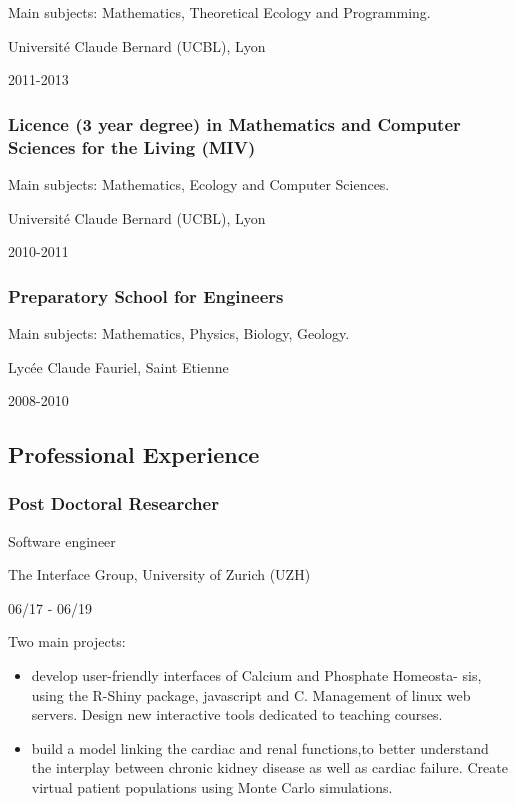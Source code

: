 \documentclass[
]{article}
\providecommand{\tightlist}{%
  \setlength{\itemsep}{0pt}\setlength{\parskip}{0pt}}
\begin{document}
Main subjects: Mathematics, Theoretical Ecology and Programming.

Université Claude Bernard (UCBL), Lyon

2011-2013

\hypertarget{licence-3-year-degree-in-mathematics-and-computer-sciences-for-the-living-miv}{%
\subsubsection{Licence (3 year degree) in Mathematics and Computer
Sciences for the Living
(MIV)}\label{licence-3-year-degree-in-mathematics-and-computer-sciences-for-the-living-miv}}

Main subjects: Mathematics, Ecology and Computer Sciences.

Université Claude Bernard (UCBL), Lyon

2010-2011

\hypertarget{preparatory-school-for-engineers}{%
\subsubsection{Preparatory School for
Engineers}\label{preparatory-school-for-engineers}}

Main subjects: Mathematics, Physics, Biology, Geology.

Lycée Claude Fauriel, Saint Etienne

2008-2010

\hypertarget{professional-experience}{%
\subsection{Professional Experience}\label{professional-experience}}

\hypertarget{post-doctoral-researcher}{%
\subsubsection{Post Doctoral
Researcher}\label{post-doctoral-researcher}}

Software engineer

The Interface Group, University of Zurich (UZH)

06/17 - 06/19

Two main projects:

\begin{itemize}
\tightlist
\item
  develop user-friendly interfaces of Calcium and Phosphate Homeosta-
  sis, using the R-Shiny package, javascript and C. Management of linux
  web servers. Design new interactive tools dedicated to teaching
  courses.
\item
  build a model linking the cardiac and renal functions,to better
  understand the interplay between chronic kidney disease as well as
  cardiac failure. Create virtual patient populations using Monte Carlo
  simulations.
\end{itemize}
\end{document}
